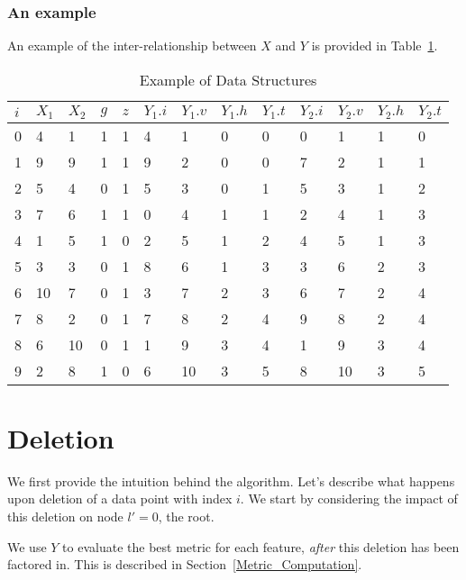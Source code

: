 \documentclass[12pt,letterpaper]{article}
\begin{document}
\subsubsection{An example}
\label{example_data_structures}

An example of the inter-relationship between \(X\) and \(Y\) is provided in
Table~\ref{tbl_example_data_structures}.

\begin{table}
  \centering
  \begin{tabular}{|l|l|l|l|l||l|l|l|l||l|l|l|l|} \hline \hline
    \(i\) & \(X_1\) & \(X_2\) & \(g\) & \(z\) & %
    \(Y_1.i\) & \(Y_1.v\) & \(Y_1.h\) & \(Y_1.t\) & 
    \(Y_2.i\) & \(Y_2.v\) & \(Y_2.h\) & \(Y_2.t\) \\ \hline \hline
    0 & 4  & 1  & 1 & 1 & 4 & 1  & 0 & 0 & 0 & 1  & 1 & 0 \\ \hline
    1 & 9  & 9  & 1 & 1 & 9 & 2  & 0 & 0 & 7 & 2  & 1 & 1 \\ \hline
    2 & 5  & 4  & 0 & 1 & 5 & 3  & 0 & 1 & 5 & 3  & 1 & 2 \\ \hline
    3 & 7  & 6  & 1 & 1 & 0 & 4  & 1 & 1 & 2 & 4  & 1 & 3 \\ \hline
    4 & 1  & 5  & 1 & 0 & 2 & 5  & 1 & 2 & 4 & 5  & 1 & 3 \\ \hline
    5 & 3  & 3  & 0 & 1 & 8 & 6  & 1 & 3 & 3 & 6  & 2 & 3 \\ \hline
    6 & 10 & 7  & 0 & 1 & 3 & 7  & 2 & 3 & 6 & 7  & 2 & 4 \\ \hline
    7 & 8  & 2  & 0 & 1 & 7 & 8  & 2 & 4 & 9 & 8  & 2 & 4 \\ \hline
    8 & 6  & 10 & 0 & 1 & 1 & 9  & 3 & 4 & 1 & 9  & 3 & 4 \\ \hline
    9 & 2  & 8  & 1 & 0 & 6 & 10 & 3 & 5 & 8 & 10 & 3 & 5 \\ \hline
    \hline
  \end{tabular}
  \caption{Example of Data Structures}
\label{tbl_example_data_structures}
\end{table}

\section{Deletion}
We first provide the intuition behind the algorithm.  Let's describe what 
happens upon deletion of a data point with index \(i\). 
We start by considering the impact of this deletion on node \(l' = 0\), the
root.

We use \(Y\) to evaluate the best metric for each feature, 
{\em after} this deletion has been factored in. This is described in 
Section~\ref{Metric_Computation}.
\end{document}
